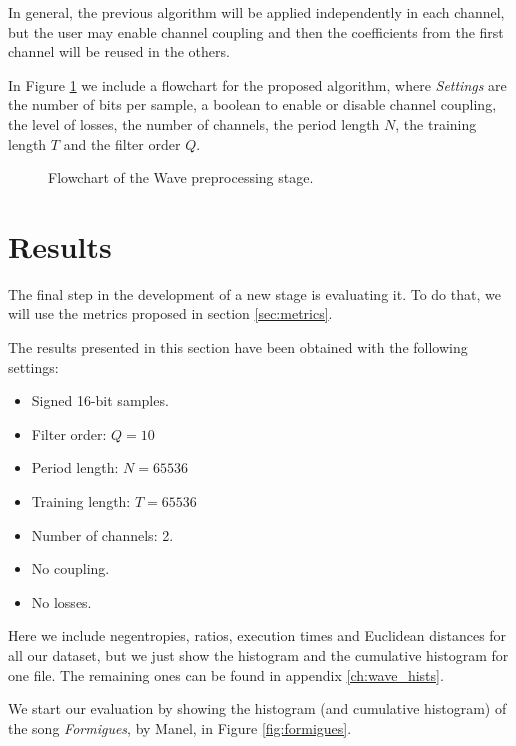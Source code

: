 In general, the previous algorithm will be applied independently in each channel, but the user may enable channel coupling and then the coefficients from the first channel will be reused in the others.

In Figure \ref{fig:wave_flowchart} we include a flowchart for the proposed algorithm, where \textit{Settings} are the number of bits per sample, a boolean to enable or disable channel coupling, the level of losses, the number of channels, the period length $N$, the training length $T$ and the filter order $Q$.

\pagebreak
\begin{figure}[h!]
	\begin{center}
		\scalebox{.93}{}
	\end{center}
	\caption{Flowchart of the Wave preprocessing stage.}
	\label{fig:wave_flowchart}
\end{figure}

\section{Results} \label{sec:wave_results}
The final step in the development of a new stage is evaluating it. To do that, we will use the metrics proposed in section \ref{sec:metrics}.

The results presented in this section have been obtained with the following settings:
\begin{itemize}
	\item Signed 16-bit samples.
	\item Filter order: $Q = 10$
	\item Period length: $N = 65536$
	\item Training length: $T = 65536$
	\item Number of channels: 2.
	\item No coupling.
	\item No losses.
\end{itemize}

Here we include negentropies, ratios, execution times and Euclidean distances for all our dataset, but we just show the histogram and the cumulative histogram for one file. The remaining ones can be found in appendix \ref{ch:wave_hists}.

We start our evaluation by showing the histogram (and cumulative histogram) of the song \textit{Formigues}, by Manel, in Figure \ref{fig:formigues}.

